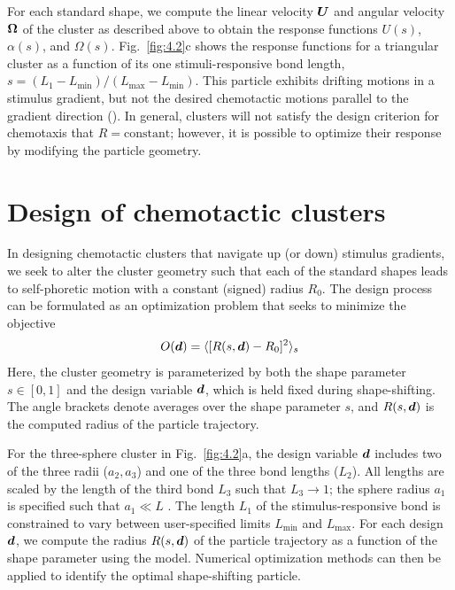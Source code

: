 For each standard shape, we compute the linear velocity $\boldsymbol{U}$ and angular velocity $\boldsymbol{\Omega}$ of the cluster as described above to obtain the response functions $U(s)$, $\alpha(s)$, and $\Omega(s)$. Fig.\ \ref{fig:4.2}c shows the response functions for a triangular cluster as a function of its one stimuli-responsive bond length, $s = (L_1 - L_{\min})/(L_{\max}-L_{\min})$.  This particle exhibits drifting motions in a stimulus gradient, but not the desired chemotactic motions parallel to the gradient direction ().  In general, clusters will not satisfy the design criterion for chemotaxis that $R=\text{constant}$; however, it is possible to optimize their response by modifying the particle geometry.

\section{Design of chemotactic clusters} In designing chemotactic clusters that navigate up (or down) stimulus gradients, we seek to alter the cluster geometry such that each of the standard shapes leads to self-phoretic motion with a constant (signed) radius $R_0$. The design process can be formulated as an optimization problem that seeks to minimize the objective
\begin{equation}
    O(\boldsymbol{d}) = \langle [R(s,\boldsymbol{d})-R_0]^2 \rangle_s
\end{equation}
Here, the cluster geometry is parameterized by both the shape parameter $s\in[0,1]$ and the design variable $\boldsymbol{d}$, which is held fixed during shape-shifting.  The angle brackets denote averages over the shape parameter $s$, and $R(s,\boldsymbol{d})$ is the computed radius of the particle trajectory.

For the three-sphere cluster in Fig.\ \ref{fig:4.2}a, the design variable $\boldsymbol{d}$ includes two of the three radii ($a_2,a_3$) and one of the three bond lengths ($L_2$). All lengths are scaled by the length of the third bond $L_3$ such that $L_3\rightarrow 1$; the sphere radius $a_1$ is specified such that $a_1\ll L$ . The length $L_1$ of the stimulus-responsive bond is constrained to vary between user-specified limits $L_{\min}$ and $L_{\max}$. For each design $\boldsymbol{d}$, we compute the radius $R(s,\boldsymbol{d})$ of the particle trajectory as a function of the shape parameter using the model.  Numerical optimization methods can then be applied to identify the optimal shape-shifting particle.

